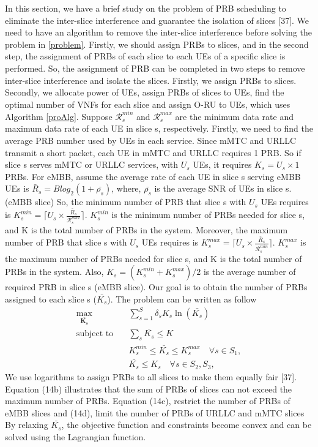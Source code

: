 \documentclass[12pt, letterpaper]{article}
\begin{document}
{ In this section, we have a brief study on the problem of PRB scheduling to eliminate  the inter-slice interference and guarantee the isolation of slices [37].
We need to have an algorithm to remove the inter-slice interference before solving the problem in \ref{problem}. Firstly, we should assign PRBs to slices, and in the second step, the assignment of PRBs of each slice to each UEs of a specific slice is performed. So, the assignment of PRB can be completed in two steps to remove inter-slice interference and isolate the slices. Firstly, we assign PRBs to slices. Secondly, we allocate power of UEs, assign PRBs of slices to UEs, find the optimal number of VNFs for each slice and assign O-RU to UEs, which uses Algorithm \ref{proAlg}.
Suppose $\mathcal{R}_{{s}}^{min}$ and $\mathcal{R}_{{s}}^{max}$ are the minimum data rate and maximum data rate of each UE in slice s, respectively.
Firstly, we need to find the average PRB number used by UEs in each service. Since mMTC and URLLC transmit a short packet, each UE in mMTC and URLLC requires 1 PRB. So if slice s serves mMTC or URLLC services, with $U_s$ UEs, it requires $K_s = U_s \times 1$ PRBs. For eMBB, assume the average rate of each UE in slice s serving eMBB UEs is $\bar{R}_s = Blog_2(1 + \bar{\rho_s})$, where, $\bar{\rho_s}$ is the average SNR of UEs in slice s. (eMBB slice)
So, the minimum number of PRB that slice s with $U_s$ UEs requires is $K_s^{min} = \lceil{U_s \times \frac{\bar{R}_s}{\mathcal{R}_{{s}}^{max}}}\rceil$. $K_s^{min} $ is the minimum number of PRBs needed for slice s, and K is the total number of PRBs in the system.
Moreover, the maximum number of PRB that slice s with $U_s$ UEs requires is $K_s^{max} = \lceil{U_s \times \frac{\bar{R}_s}{\mathcal{R}_{{s}}^{min}}}\rceil$. $K_s^{max} $ is the maximum number of PRBs needed for slice s, and K is the total number of PRBs in the system. Also, $K_s = (K_s^{min}+K_s^{max})/2$ is the average number of required PRB in slice s (eMBB slice).
Our goal is to obtain the number of PRBs assigned to each slice s ($\bar{K_s}$).
The problem can be written as follow
\begin{subequations}\label{prob:prb}
\begin{alignat}{4}
\max\limits_{\boldsymbol{\bar{K_s}}} \quad &  \sum_{s=1}^{S}\delta_s K_s \ln(\bar{K_s}) \ \\
\text{subject to} \quad  & \sum_s{\bar{K_s}} \leq K
 \label{prb0} \\
& K_s^{min} \leq \bar{K_s}  \leq K_s^{max}  \quad \forall s \in S_1,\label{prb1} \\
&  \bar{K_s} \leq K_s  \quad \forall s \in S_2, S_3,\label{prb2}
\end{alignat}
\label{constraints}
\end{subequations}
We use logarithms to assign PRBs to all slices to make
them equally fair [37]. Equation (14b) illustrates that the
sum of PRBs of slices can not exceed the maximum number
of PRBs. Equation (14c), restrict the number of PRBs
of eMBB slices and (14d), limit the number of PRBs of
URLLC and mMTC slices By relaxing $\bar{K_s}$, the objective function and constraints become convex and can be solved using the Lagrangian function.

}
\end{document}
